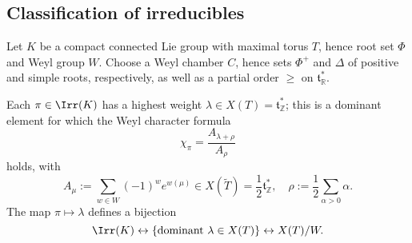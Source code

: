 \documentclass[reqno]{amsart} 
\begin{document}
\subsection{Classification of irreducibles}\label{sec:cnh2vo0s6i}
\begin{theorem}\label{thm:highest-weight-general-gp}
  Let $K$ be a compact connected Lie group with maximal torus $T$, hence root set $\Phi$ and Weyl group $W$.  Choose a Weyl chamber $C$, hence sets $\Phi^+$ and $\Delta$ of positive and simple roots, respectively, as well as a partial order $\geq$ on $\mathfrak{t}_{\mathbb{R}}^*$.

  Each $\pi \in \Irr(K)$ has a highest weight $\lambda \in X(T) = \mathfrak{t}_{\mathbb{Z}}^*$; this is a dominant element for which the Weyl character formula
  \begin{equation*}
    \chi_{\pi} = \frac{A_{\lambda+\rho}}{A_\rho }
  \end{equation*}
  holds, with
  \begin{equation*}
    A_{\mu} := \sum_{w \in W} (-1)^w e^{w(\mu)} \in X(\tilde{T}) = \frac{1}{2} \mathfrak{t}_{\mathbb{Z}}^*, \quad \rho := \frac{1}{2} \sum_{\alpha > 0} \alpha.
  \end{equation*}
  The map $\pi \mapsto \lambda$ defines a bijection
  \begin{equation*}
    \Irr(K)
    \leftrightarrow \{\text{dominant }
    \lambda \in X(T)\}
    \leftrightarrow
    X(T)/W.
  \end{equation*}
\end{theorem}
\end{document}
